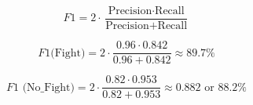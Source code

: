 \clearpage

\begin{equation}
F1 = 2 \cdot \frac{\text{Precision} \cdot \text{Recall}}{\text{Precision} + \text{Recall}}
\label{f1score}
\end{equation}

\[
F1 \text{(Fight)} = 2 \cdot \frac{0.96 \cdot 0.842}{0.96 + 0.842} \approx 89.7\%
\]

\[
F1 \text{ (No\_Fight)} = 2 \cdot \frac{0.82 \cdot 0.953}{0.82 + 0.953} \approx 0.882 \text{ or } 88.2\%
\]

\vspace{1.5cm}




